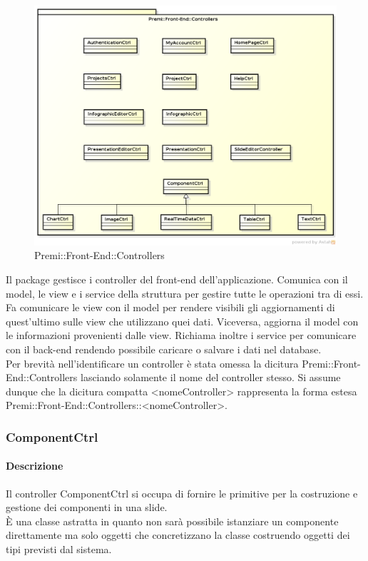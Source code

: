 \begin{figure}[h]
	\centering
	\includegraphics[width=1.0\linewidth]{img/premi_front_end_controllers}
	\caption[Premi::Front-End::Controllers]{Premi::Front-End::Controllers}
\end{figure}
Il package gestisce i controller del front-end dell'applicazione. Comunica con il model, le view e i service della struttura per gestire tutte le operazioni tra di essi. Fa comunicare le view con il model per rendere visibili gli aggiornamenti di quest'ultimo sulle view che utilizzano quei dati. Viceversa, aggiorna il model con le informazioni provenienti dalle view. Richiama inoltre i service per comunicare con il back-end rendendo possibile caricare o salvare i dati nel database.\\
Per brevità nell'identificare un controller è stata omessa la dicitura Premi::Front-End::Controllers lasciando solamente il nome del controller stesso. Si assume dunque che la dicitura compatta <nomeController> rappresenta la forma estesa Premi::Front-End::Controllers::<nomeController>.

\newpage
\subsubsection{ComponentCtrl}
      \paragraph{Descrizione}
	Il controller ComponentCtrl si occupa di fornire le primitive per la costruzione e gestione dei componenti in una slide.\\
	È una classe astratta in quanto non sarà possibile istanziare un componente direttamente ma solo oggetti che concretizzano la classe costruendo oggetti dei tipi previsti dal sistema.\\
		
